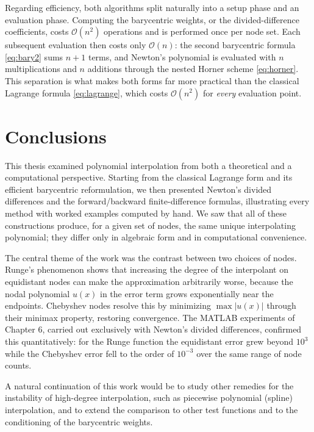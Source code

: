 \documentclass[12pt, a4paper]{article}
\theoremstyle{plain}
\theoremstyle{definition}
\theoremstyle{remark}
\begin{document}
Regarding efficiency, both algorithms split naturally into a setup phase and an evaluation phase. Computing the barycentric weights, or the divided-difference coefficients, costs $\mathcal{O}(n^2)$ operations and is performed once per node set. Each subsequent evaluation then costs only $\mathcal{O}(n)$: the second barycentric formula \eqref{eq:bary2} sums $n+1$ terms, and Newton's polynomial is evaluated with $n$ multiplications and $n$ additions through the nested Horner scheme \eqref{eq:horner}. This separation is what makes both forms far more practical than the classical Lagrange formula \eqref{eq:lagrange}, which costs $\mathcal{O}(n^2)$ for \emph{every} evaluation point.

\newpage
\section{Conclusions}

This thesis examined polynomial interpolation from both a theoretical and a computational perspective. Starting from the classical Lagrange form and its efficient barycentric reformulation, we then presented Newton's divided differences and the forward/backward finite-difference formulas, illustrating every method with worked examples computed by hand. We saw that all of these constructions produce, for a given set of nodes, the same unique interpolating polynomial; they differ only in algebraic form and in computational convenience.

The central theme of the work was the contrast between two choices of nodes. Runge's phenomenon shows that increasing the degree of the interpolant on equidistant nodes can make the approximation arbitrarily worse, because the nodal polynomial $u(x)$ in the error term grows exponentially near the endpoints. Chebyshev nodes resolve this by minimizing $\max|u(x)|$ through their minimax property, restoring convergence. The MATLAB experiments of Chapter 6, carried out exclusively with Newton's divided differences, confirmed this quantitatively: for the Runge function the equidistant error grew beyond $10^3$ while the Chebyshev error fell to the order of $10^{-3}$ over the same range of node counts.

A natural continuation of this work would be to study other remedies for the instability of high-degree interpolation, such as piecewise polynomial (spline) interpolation, and to extend the comparison to other test functions and to the conditioning of the barycentric weights.
\end{document}
